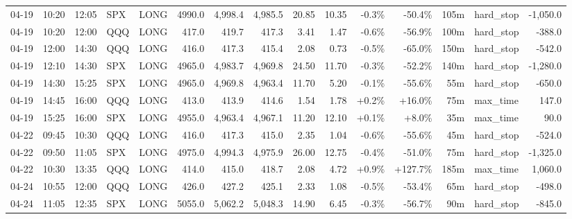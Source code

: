 \documentclass[11pt,a4paper,twoside]{article}
\begin{document}
\begin{landscape}
\begin{center}
\begin{longtable}{>{\color{txtmain}}l l l l l r r r r r r r r >{\color{txtmain}}l r}
04-19 & 10:20 & 12:05 & SPX & LONG & 4990.0 & 4,998.4 & 4,985.5 & 20.85 & 10.35 & \textcolor{lossred}{-0.3\%} & \textcolor{lossred}{-50.4\%} & 105m & hard\_stop & \textcolor{lossred}{-1,050.0} \\
04-19 & 10:20 & 12:00 & QQQ & LONG & 417.0 & 419.7 & 417.3 & 3.41 & 1.47 & \textcolor{lossred}{-0.6\%} & \textcolor{lossred}{-56.9\%} & 100m & hard\_stop & \textcolor{lossred}{-388.0} \\
04-19 & 12:00 & 14:30 & QQQ & LONG & 416.0 & 417.3 & 415.4 & 2.08 & 0.73 & \textcolor{lossred}{-0.5\%} & \textcolor{lossred}{-65.0\%} & 150m & hard\_stop & \textcolor{lossred}{-542.0} \\
04-19 & 12:10 & 14:30 & SPX & LONG & 4965.0 & 4,983.7 & 4,969.8 & 24.50 & 11.70 & \textcolor{lossred}{-0.3\%} & \textcolor{lossred}{-52.2\%} & 140m & hard\_stop & \textcolor{lossred}{-1,280.0} \\
04-19 & 14:30 & 15:25 & SPX & LONG & 4965.0 & 4,969.8 & 4,963.4 & 11.70 & 5.20 & \textcolor{lossred}{-0.1\%} & \textcolor{lossred}{-55.6\%} & 55m & hard\_stop & \textcolor{lossred}{-650.0} \\
04-19 & 14:45 & 16:00 & QQQ & LONG & 413.0 & 413.9 & 414.6 & 1.54 & 1.78 & \textcolor{wingreen}{+0.2\%} & \textcolor{wingreen}{+16.0\%} & 75m & max\_time & \textcolor{wingreen}{147.0} \\
04-19 & 15:25 & 16:00 & SPX & LONG & 4955.0 & 4,963.4 & 4,967.1 & 11.20 & 12.10 & \textcolor{wingreen}{+0.1\%} & \textcolor{wingreen}{+8.0\%} & 35m & max\_time & \textcolor{wingreen}{90.0} \\
04-22 & 09:45 & 10:30 & QQQ & LONG & 416.0 & 417.3 & 415.0 & 2.35 & 1.04 & \textcolor{lossred}{-0.6\%} & \textcolor{lossred}{-55.6\%} & 45m & hard\_stop & \textcolor{lossred}{-524.0} \\
04-22 & 09:50 & 11:05 & SPX & LONG & 4975.0 & 4,994.3 & 4,975.9 & 26.00 & 12.75 & \textcolor{lossred}{-0.4\%} & \textcolor{lossred}{-51.0\%} & 75m & hard\_stop & \textcolor{lossred}{-1,325.0} \\
04-22 & 10:30 & 13:35 & QQQ & LONG & 414.0 & 415.0 & 418.7 & 2.08 & 4.72 & \textcolor{wingreen}{+0.9\%} & \textcolor{wingreen}{+127.7\%} & 185m & max\_time & \textcolor{wingreen}{1,060.0} \\
04-24 & 10:55 & 12:00 & QQQ & LONG & 426.0 & 427.2 & 425.1 & 2.33 & 1.08 & \textcolor{lossred}{-0.5\%} & \textcolor{lossred}{-53.4\%} & 65m & hard\_stop & \textcolor{lossred}{-498.0} \\
04-24 & 11:05 & 12:35 & SPX & LONG & 5055.0 & 5,062.2 & 5,048.3 & 14.90 & 6.45 & \textcolor{lossred}{-0.3\%} & \textcolor{lossred}{-56.7\%} & 90m & hard\_stop & \textcolor{lossred}{-845.0} \\

\end{longtable}
\end{center}
\end{landscape}
\end{document}

